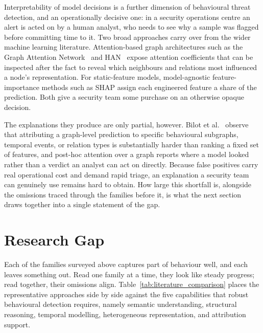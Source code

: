 \documentclass[%
    BCOR=10mm,
    DIV=13,
    toc=bibliography,
    toc=listof,
    oneside,
    12pt,
]{scrbook}
\begin{document}
Interpretability of model decisions is a further dimension of behavioural threat
detection, and an operationally decisive one: in a security operations centre an
alert is acted on by a human analyst, who needs to see why a sample was flagged
before committing time to it. Two broad approaches carry over from the wider machine
learning literature. Attention-based graph architectures such as the Graph Attention
Network~\cite{velickovic2018gat} and HAN~\cite{han2019} expose attention coefficients
that can be inspected after the fact to reveal which neighbours and relations most
influenced a node's representation. For static-feature models, model-agnostic
feature-importance methods such as SHAP assign each engineered feature a share of the
prediction. Both give a security team some purchase on an otherwise opaque decision.

The explanations they produce are only partial, however. Bilot et
al.~\cite{bilot2024survey} observe that attributing a graph-level prediction to
specific behavioural subgraphs, temporal events, or relation types is substantially
harder than ranking a fixed set of features, and post-hoc attention over a graph
reports where a model looked rather than a verdict an analyst can act on directly.
Because false positives carry real operational cost and demand rapid triage, an
explanation a security team can genuinely use remains hard to obtain. How large this
shortfall is, alongside the omissions traced through the families before it, is what
the next section draws together into a single statement of the gap.

\section{Research Gap}
\label{sec:research_gap}

\begingroup
\sloppy

Each of the families surveyed above captures part of behaviour well, and each
leaves something out. Read one family at a time, they look like steady progress;
read together, their omissions align. Table~\ref{tab:literature_comparison} places
the representative approaches side by side against the five capabilities that robust
behavioural detection requires, namely semantic understanding, structural reasoning,
temporal modelling, heterogeneous representation, and attribution support.
\end{document}
